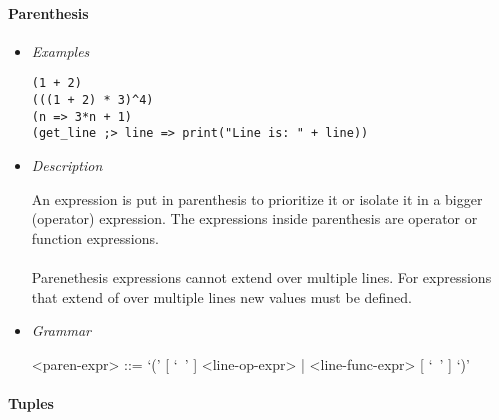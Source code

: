 \documentclass{article}
\begin{document}
\paragraph{Parenthesis}

\begin{itemize}

\item \textit{Examples}
\begin{verbatim}
(1 + 2)
(((1 + 2) * 3)^4)
(n => 3*n + 1)
(get_line ;> line => print("Line is: " + line))
\end{verbatim}

\item \textit{Description}

An expression is put in parenthesis to prioritize it or isolate it in a bigger
(operator) expression. The expressions inside parenthesis are operator
or function expressions.
\\\\
Parenethesis expressions cannot extend over multiple lines. For expressions
that extend of over multiple lines new values must be defined.

\item \textit{Grammar}
\begin{grammar}
<paren-expr> ::= `(' [ `\ ' ] <line-op-expr> | <line-func-expr> [ `\ ' ] `)'
\end{grammar}

\end{itemize}

\paragraph{Tuples}
\end{document}
